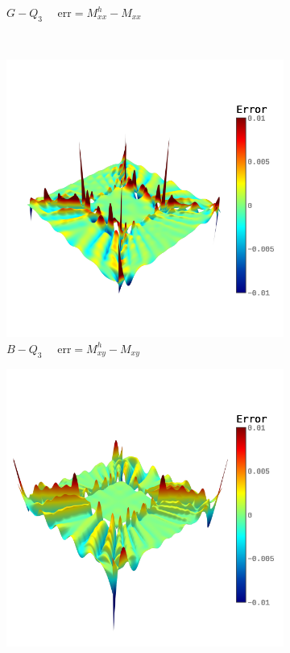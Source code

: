 \begin{figure}[h]
\begin{subfigure}[t]{.45\linewidth}
		\caption{$G-Q_3$ $\quad \text{err} = M_{xx}^h-M_{xx}$}
	\end{subfigure}\\
	\begin{subfigure}[t]{.45\linewidth}
		\center
		\includegraphics[scale=.3,trim={0cm 1.5cm 0cm 1.5cm},clip]{e_Mxy}
		\caption{$B-Q_3$ $\quad \text{err} = M_{xy}^h-M_{xy}$}
	\end{subfigure}
	\begin{subfigure}[t]{.45\linewidth}
		\center
		\includegraphics[scale=.3,trim={0cm 1.5cm 0cm 1.5cm},clip]{g_Mxy}

\end{subfigure}
\end{figure}
